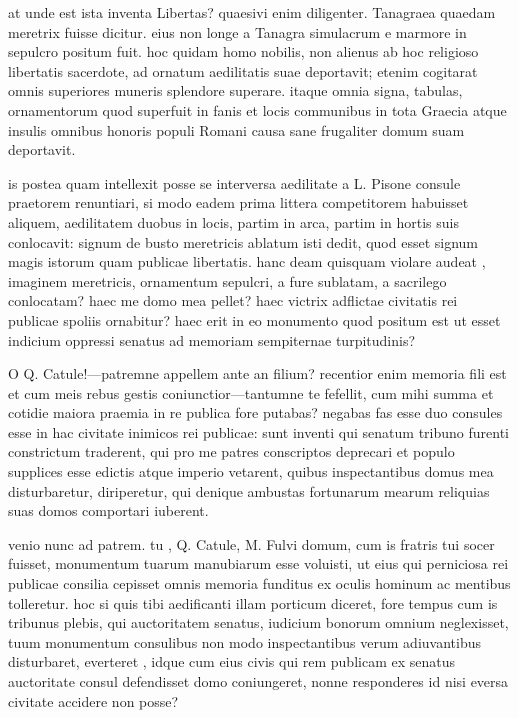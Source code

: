  at unde est ista inventa Libertas? quaesivi enim diligenter. Tanagraea quaedam meretrix fuisse dicitur. eius non longe a Tanagra simulacrum e marmore in sepulcro positum fuit. hoc quidam homo nobilis, non alienus ab hoc religioso libertatis sacerdote, ad ornatum aedilitatis suae deportavit; etenim cogitarat omnis superiores muneris splendore superare. itaque omnia signa, tabulas, ornamentorum quod superfuit in fanis et locis communibus in tota Graecia atque insulis omnibus honoris populi Romani causa sane frugaliter domum suam deportavit.

 is postea quam intellexit posse se interversa aedilitate a L. Pisone consule praetorem renuntiari, si modo eadem prima littera competitorem habuisset aliquem, aedilitatem duobus in locis, partim in arca, partim in hortis suis conlocavit: signum de busto meretricis ablatum isti dedit, quod esset signum magis istorum quam publicae libertatis. hanc deam quisquam violare audeat , imaginem meretricis, ornamentum sepulcri, a fure sublatam, a sacrilego conlocatam? haec me domo mea pellet? haec victrix adflictae civitatis rei publicae spoliis ornabitur? haec erit in eo monumento quod positum est ut esset indicium oppressi senatus ad memoriam sempiternae turpitudinis?

 O Q. Catule!—patremne appellem ante an filium? recentior enim memoria fili est et cum meis rebus gestis coniunctior—tantumne te fefellit, cum mihi summa et cotidie maiora praemia in re publica fore putabas? negabas fas esse duo consules esse in hac civitate inimicos rei publicae: sunt inventi qui senatum tribuno furenti constrictum traderent, qui pro me patres conscriptos deprecari et populo supplices esse edictis atque imperio vetarent, quibus inspectantibus domus mea disturbaretur, diriperetur, qui denique ambustas fortunarum mearum reliquias suas domos comportari iuberent.

 venio nunc ad patrem. tu , Q. Catule, M. Fulvi domum, cum is fratris tui socer fuisset, monumentum tuarum manubiarum esse voluisti, ut eius qui perniciosa rei publicae consilia cepisset omnis memoria funditus ex oculis hominum ac mentibus tolleretur. hoc si quis tibi aedificanti illam porticum diceret, fore tempus cum is tribunus plebis, qui auctoritatem senatus, iudicium bonorum omnium neglexisset, tuum monumentum consulibus non modo inspectantibus verum adiuvantibus disturbaret, everteret , idque cum eius civis qui rem publicam ex senatus auctoritate consul defendisset domo coniungeret, nonne responderes id nisi eversa civitate accidere non posse?

